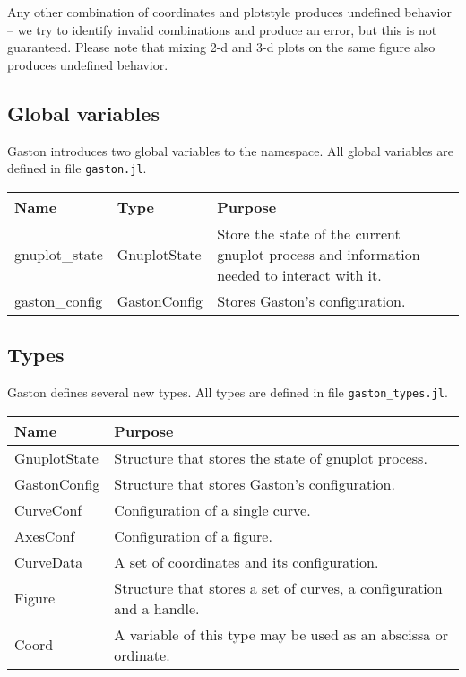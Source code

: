 \documentclass[11pt]{article}
\newcommand{\cmd}[1]{\texttt{#1}}
\begin{document}
Any other combination of coordinates and plotstyle produces undefined behavior
-- we try to identify invalid combinations and produce an error, but this is
not guaranteed. Please note that mixing 2-d and 3-d plots on the same figure
also produces undefined behavior.

\subsection{Global variables}

Gaston introduces two global variables to the namespace. All global variables
are defined in file \cmd{gaston.jl}.

\begin{center}
	\begin{tabular}{llp{7cm}}
		\toprule
		\textbf{Name} & \textbf{Type} & \textbf{Purpose} \\
		\midrule
		gnuplot\_state & GnuplotState & Store the state of the current gnuplot
		process and information needed to interact with it. \\
		gaston\_config & GastonConfig & Stores Gaston's configuration.\\
		\bottomrule
	\end{tabular}
\end{center}

\subsection{Types}

Gaston defines several new types. All types are defined in file
\cmd{gaston\_types.jl}.

\begin{center}
	\begin{tabular}{lp{8cm}}
		\toprule
		\textbf{Name} & \textbf{Purpose} \\
		\midrule
		GnuplotState & Structure that stores the state of gnuplot process. \\
		GastonConfig & Structure that stores Gaston's configuration. \\
		CurveConf & Configuration of a single curve. \\
		AxesConf & Configuration of a figure. \\
		CurveData & A set of coordinates and its configuration. \\
		Figure & Structure that stores a set of curves, a configuration and a
		handle. \\
		Coord & A variable of this type may be used as an abscissa or ordinate. \\
		\bottomrule
	\end{tabular}
\end{center}
\end{document}
